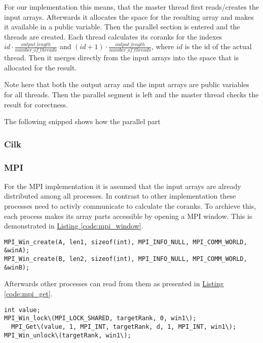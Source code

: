 For our implementation this means, that the master thread first reads/creates the input arrays.
Afterwards it allocates the space for the resulting array and makes it available in a public variable.
Then the parallel section is entered and the threads are created.
Each thread calculates its coranks for the indexes
$id \cdot \frac{output\_length}{number\_of\_threads}$
and
$(id+1)\cdot \frac{output\_length}{number\_of\_threads}$, where $id$ is the id of the actual thread.
Then it merges directly from the input arrays into the space that is allocated for the result.

Note here that both the output array and the input arrays are public variables for all threads.
Then the parallel segment is left and the master thread checks the result for corectness.

The following snipped shows how the parallel part


\subsubsection{Cilk}

\subsubsection{MPI}
For the MPI implementation it is assumed that the input arrays are already distributed among all processes.
In contrast to other implementation these processes need to activly communicate to calculate the coranks.
To archieve this, each process makes its array parts accessible by opening a MPI window.
This is demonstrated in \hyperref[code:mpi_window]{Listing \ref*{code:mpi_window}}.

\begin{lstlisting}[caption=window to share arrays, label=code:mpi_window,style=c]
MPI_Win_create(A, len1, sizeof(int), MPI_INFO_NULL, MPI_COMM_WORLD, &winA);
MPI_Win_create(B, len2, sizeof(int), MPI_INFO_NULL, MPI_COMM_WORLD, &winB);
\end{lstlisting}

Afterwards other processes can read from them as presented in \hyperref[code:mpi_get]{Listing \ref*{code:mpi_get}}.

\begin{lstlisting}[caption=window to share arrays, label=code:mpi_get,style=c]
int value;
MPI_Win_lock\(MPI_LOCK_SHARED, targetRank, 0, win1\);
  MPI_Get\(value, 1, MPI_INT, targetRank, d, 1, MPI_INT, win1\);
MPI_Win_unlock\(targetRank, win1\);
\end{lstlisting}


